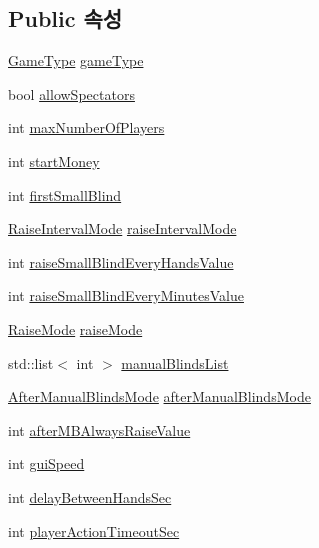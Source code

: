 \subsection*{Public 속성}
\begin{DoxyCompactItemize}
\item 
\hyperlink{gamedata_8h_a86864855734edb7b2cb1efdc7a03fd57}{Game\-Type} \hyperlink{struct_game_data_a44ded208d33fed8dbf1edd827faa847b}{game\-Type}
\item 
bool \hyperlink{struct_game_data_aa254390c51645ce5b18fd55e27e04f79}{allow\-Spectators}
\item 
int \hyperlink{struct_game_data_aba8c8d38c50dab71ad1530bbc2003b46}{max\-Number\-Of\-Players}
\item 
int \hyperlink{struct_game_data_a1b697f477ae03d3bd3323c4c099d6d58}{start\-Money}
\item 
int \hyperlink{struct_game_data_a0c9e8a63d5c02de30463c0b6beacebe3}{first\-Small\-Blind}
\item 
\hyperlink{gamedata_8h_a39f8de2f47cb4adf9038f5c6d6a8b8e6}{Raise\-Interval\-Mode} \hyperlink{struct_game_data_a298a24818a2bf81d8c7565812ff2eb26}{raise\-Interval\-Mode}
\item 
int \hyperlink{struct_game_data_a943a5365d2a5ac840bb3479c6fe1c23b}{raise\-Small\-Blind\-Every\-Hands\-Value}
\item 
int \hyperlink{struct_game_data_a6601463dbb7b1db927525b24d79e63b8}{raise\-Small\-Blind\-Every\-Minutes\-Value}
\item 
\hyperlink{gamedata_8h_a5532f34d7415bdfab60d67400cd5fc02}{Raise\-Mode} \hyperlink{struct_game_data_a592278fc8c3d824ddbdc3f8a401320bc}{raise\-Mode}
\item 
std\-::list$<$ int $>$ \hyperlink{struct_game_data_aff746a781ec8317d890f860ad450ab8e}{manual\-Blinds\-List}
\item 
\hyperlink{gamedata_8h_a250ebe9cdf4567798600e292202a66e6}{After\-Manual\-Blinds\-Mode} \hyperlink{struct_game_data_a7e8255dd232821d0419b31893b3acbb4}{after\-Manual\-Blinds\-Mode}
\item 
int \hyperlink{struct_game_data_a68e6f78103983935a5f6b20abb595355}{after\-M\-B\-Always\-Raise\-Value}
\item 
int \hyperlink{struct_game_data_a19b38d37fbd225504166856f187f38f3}{gui\-Speed}
\item 
int \hyperlink{struct_game_data_aa37d21f5ccbeca258400c07d7fbbf6da}{delay\-Between\-Hands\-Sec}
\item 
int \hyperlink{struct_game_data_a7379c03ecb75bda8cf95d215b41ae83b}{player\-Action\-Timeout\-Sec}
\end{DoxyCompactItemize}


